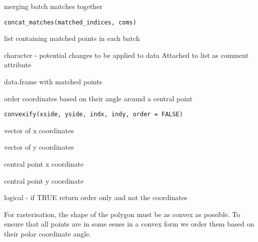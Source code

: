 \documentclass[a4paper]{book}
\begin{document}
%
\begin{Description}
merging batch matches together
\end{Description}
%
\begin{Usage}
\begin{verbatim}
concat_matches(matched_indices, coms)
\end{verbatim}
\end{Usage}
%
\begin{Arguments}
\begin{ldescription}
\item[\code{matched\_indices}] list containing matched points in each batch

\item[\code{coms}] character - potential changes to be applied to data
Attached to list as comment attribute
\end{ldescription}
\end{Arguments}
%
\begin{Value}
data.frame with matched points
\end{Value}
%
\begin{Description}
order coordinates based on their angle around a central point
\end{Description}
%
\begin{Usage}
\begin{verbatim}
convexify(xside, yside, indx, indy, order = FALSE)
\end{verbatim}
\end{Usage}
%
\begin{Arguments}
\begin{ldescription}
\item[\code{xside}] vector of x coordinates

\item[\code{yside}] vector of y coordinates

\item[\code{indx}] central point x coordinate

\item[\code{indy}] central point y coordinate

\item[\code{order}] logical - if TRUE return order only and not the
coordinates
\end{ldescription}
\end{Arguments}
%
\begin{Details}
For rasterisation, the shape of the polygon must be as
convex as possible. To ensure that all points are in some sense 
in a convex form we order them based on their polar coordinate 
angle.
\end{Details}
\end{document}
